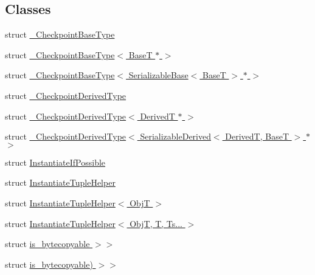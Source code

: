 \subsection*{Classes}
\begin{DoxyCompactItemize}
\item 
struct \hyperlink{structcheckpoint_1_1dispatch_1_1vrt_1_1___checkpoint_base_type}{\+\_\+\+Checkpoint\+Base\+Type}
\item 
struct \hyperlink{structcheckpoint_1_1dispatch_1_1vrt_1_1___checkpoint_base_type_3_01_base_t_01_5_01_4}{\+\_\+\+Checkpoint\+Base\+Type$<$ Base\+T $\ast$ $>$}
\item 
struct \hyperlink{structcheckpoint_1_1dispatch_1_1vrt_1_1___checkpoint_base_type_3_01_serializable_base_3_01_base_t_01_4_01_5_01_4}{\+\_\+\+Checkpoint\+Base\+Type$<$ Serializable\+Base$<$ Base\+T $>$ $\ast$ $>$}
\item 
struct \hyperlink{structcheckpoint_1_1dispatch_1_1vrt_1_1___checkpoint_derived_type}{\+\_\+\+Checkpoint\+Derived\+Type}
\item 
struct \hyperlink{structcheckpoint_1_1dispatch_1_1vrt_1_1___checkpoint_derived_type_3_01_derived_t_01_5_01_4}{\+\_\+\+Checkpoint\+Derived\+Type$<$ Derived\+T $\ast$ $>$}
\item 
struct \hyperlink{structcheckpoint_1_1dispatch_1_1vrt_1_1___checkpoint_derived_type_3_01_serializable_derived_3_0142c576e50eb568281bb6c0a86d22e7e8}{\+\_\+\+Checkpoint\+Derived\+Type$<$ Serializable\+Derived$<$ Derived\+T, Base\+T $>$ $\ast$ $>$}
\item 
struct \hyperlink{structcheckpoint_1_1dispatch_1_1vrt_1_1_instantiate_if_possible}{Instantiate\+If\+Possible}
\item 
struct \hyperlink{structcheckpoint_1_1dispatch_1_1vrt_1_1_instantiate_tuple_helper}{Instantiate\+Tuple\+Helper}
\item 
struct \hyperlink{structcheckpoint_1_1dispatch_1_1vrt_1_1_instantiate_tuple_helper_3_01_obj_t_01_4}{Instantiate\+Tuple\+Helper$<$ Obj\+T $>$}
\item 
struct \hyperlink{structcheckpoint_1_1dispatch_1_1vrt_1_1_instantiate_tuple_helper_3_01_obj_t_00_01_t_00_01_ts_8_8_8_01_4}{Instantiate\+Tuple\+Helper$<$ Obj\+T, T, Ts... $>$}
\item 
struct \hyperlink{structcheckpoint_1_1dispatch_1_1vrt_1_1_instantiate_if_possible_3_01_obj_t_00_01_serializer_t_001f08bb798ccb49f9c53f303cf6b979fb}{is\+\_\+bytecopyable $>$$>$}
\item 
struct \hyperlink{structcheckpoint_1_1dispatch_1_1vrt_1_1_instantiate_if_possible_3_01_obj_t_00_01_serializer_t_004e0f4f52ca81416658a563b81b03387d}{is\+\_\+bytecopyable) $>$$>$}

\end{DoxyCompactItemize}
